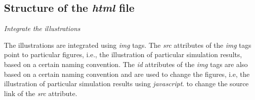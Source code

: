 \documentclass[12pt]{article}
\begin{document}
%

\subsection{Structure of the \emph{html} file}\label{SecHowHtm}

\vspace{1em}
\noindent\emph{Integrate the illustrations}

The illustrations are integrated using \emph{img} tags. 
%
The \emph{src} attributes of the \emph{img} tags point to particular figures, i.e., the illustration of particular simulation results, based on a certain naming convention. 
%
The \emph{id} attributes of the \emph{img} tags are also based on a certain naming convention and are used 
to change the figures, i.e, the illustration of particular simulation results using \emph{javascript}. 
to change the source link of the \emph{src} attribute. 
\end{document}
